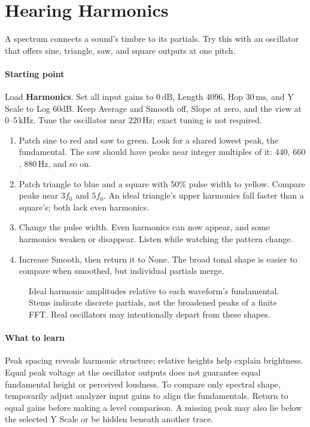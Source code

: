 \section{Hearing Harmonics}\label{sec:harmonics}

A spectrum connects a sound's timbre to its partials. Try this with an
oscillator that offers sine, triangle, saw, and square outputs at one pitch.

\paragraph{Starting point}
Load \textbf{Harmonics}. Set all input gains to $0\,\mathrm{dB}$, Length
4096, Hop $30\,\mathrm{ms}$, and Y Scale to Log 60dB. Keep Average and
Smooth off, Slope at zero, and the view at $0$--$5\,\mathrm{kHz}$.
Tune the oscillator near $220\,\mathrm{Hz}$; exact tuning is not required.

\begin{enumerate}
  \item Patch sine to red and saw to green. Look for a shared lowest peak,
  the fundamental. The saw should have peaks near integer multiples of it:
  $440$, $660$, $880\,\mathrm{Hz}$, and so on.
  \item Patch triangle to blue and a square with 50\% pulse width to yellow.
  Compare peaks near $3f_0$ and $5f_0$. An ideal triangle's upper harmonics
  fall faster than a square's; both lack even harmonics.
  \item Change the pulse width. Even harmonics can now appear, and some
  harmonics weaken or disappear. Listen while watching the pattern change.
  \item Increase Smooth, then return it to None. The broad tonal shape is
  easier to compare when smoothed, but individual partials merge.
\end{enumerate}

\begin{figure}[!htp]
\centering

\caption{Ideal harmonic amplitudes relative to each waveform's fundamental.
Stems indicate discrete partials, not the broadened peaks of a finite FFT.
Real oscillators may intentionally depart from these shapes.}
\end{figure}

\paragraph{What to learn}
Peak spacing reveals harmonic structure; relative heights help explain
brightness. Equal peak voltage at the oscillator outputs does not guarantee
equal fundamental height or perceived loudness. To compare only spectral
shape, temporarily adjust analyzer input gains to align the fundamentals.
Return to equal gains before making a level comparison. A missing peak may
also lie below the selected Y Scale or be hidden beneath another trace.
